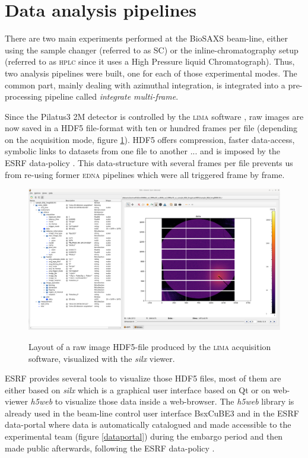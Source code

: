 \documentclass[preprint]{iucr}              %
\begin{document}
\section{Data analysis pipelines}
\label{pipeline}
There are two main experiments performed at the BioSAXS beam-line, either using the sample changer (referred to as SC) or the inline-chromatography setup (referred to as \textsc{hplc} since it uses a High Pressure liquid Chromatograph).
Thus, two analysis pipelines were built, one for each of those experimental modes.
The common part, mainly dealing with azimuthal integration, is integrated into a pre-processing pipeline called \textit{integrate multi-frame}.

Since the Pilatus3 2M detector is controlled by the \textsc{lima} software \cite{lima}, raw images are now saved in a HDF5 file-format \cite{hdf5} with ten or hundred frames per file (depending on the acquisition mode, figure \ref{lima}).
HDF5 offers compression, faster data-access, symbolic links to datasets from one file to another ... and is imposed by the ESRF data-policy \cite{data-policy}. 
This data-structure with several frames per file prevents us from re-using former \textsc{edna} pipelines which were  all triggered frame by frame.

\begin{figure}
     \caption{Layout of a raw image HDF5-file produced by the \textsc{lima} acquisition software, visualized with the \textit{silx} viewer.}
     \includegraphics[width=12cm]{lima.eps}
     \label{lima}
\end{figure}

ESRF provides several tools to visualize those HDF5 files, most of them are either based on \textit{silx} \cite{silx} which is a graphical user interface based on Qt \cite{pyqt} or on web-viewer \textit{h5web} \cite{h5web} to visualize those data inside a web-browser.
The \textit{h5web} library is already used in the beam-line control user interface BsxCuBE3 \cite{bm29_2022} and in the ESRF data-portal \cite{data-portal} where data is automatically catalogued and made accessible to the experimental team (figure \ref{dataportal}) during  the embargo period and then made public afterwards, following the ESRF data-policy \cite{data-policy}. 
\end{document}
